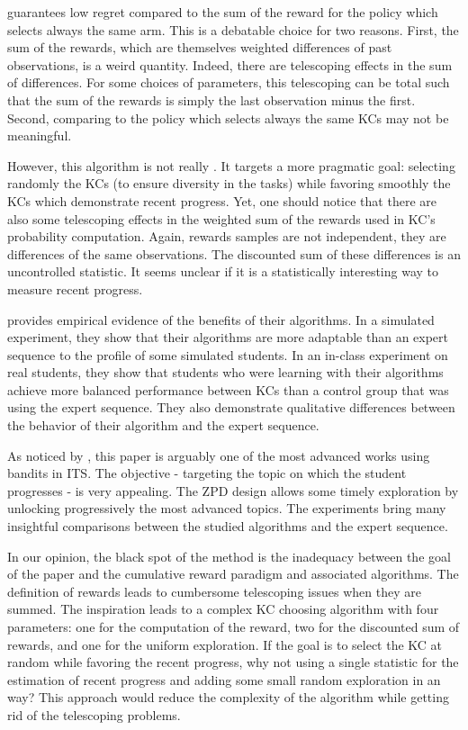 \EXP guarantees low regret compared to the sum of the reward for the policy which selects always the same arm. This is a debatable choice for two reasons. First, the sum of the rewards, which are themselves weighted differences of past observations, is a weird quantity. Indeed, there are telescoping effects in the sum of differences. For some choices of parameters, this telescoping can be total such that the sum of the rewards is simply the last observation minus the first. Second, comparing to the policy which selects always the same KCs may not be meaningful. 

However, this algorithm is not really \EXP. It targets a more pragmatic goal: selecting randomly the KCs (to ensure diversity in the tasks) while favoring smoothly the KCs which demonstrate recent progress. Yet, one should notice that there are also some telescoping effects in the weighted sum of the rewards used in KC's probability computation. Again, rewards samples are not independent, they are differences of the same observations. The discounted sum of these differences is an uncontrolled statistic. It seems unclear if it is a statistically interesting way to measure recent progress.

\citet{clement2015multi} provides empirical evidence of the benefits of their algorithms. In a simulated experiment, they show that their algorithms are more adaptable than an expert sequence to the profile of some simulated students. In an in-class experiment on real students, they show that students who were learning with their algorithms achieve more balanced performance between KCs than a control group that was using the expert sequence. They also demonstrate qualitative differences between the behavior of their algorithm and the expert sequence.

As noticed by \citet{pikeburke2019phd}, this paper is arguably one of the most advanced works using bandits in ITS. The objective - targeting the topic on which the student progresses - is very appealing. The ZPD design allows some timely exploration by unlocking progressively the most advanced topics. The experiments bring many insightful comparisons between the studied algorithms and the expert sequence.

In our opinion, the black spot of the method is the inadequacy between the goal of the paper and the cumulative reward paradigm and associated algorithms. The definition of rewards leads to cumbersome telescoping issues when they are summed. The \EXP inspiration leads to a complex KC choosing algorithm with four parameters: one for the computation of the reward, two for the discounted sum of rewards, and one for the uniform exploration. If the goal is to select the KC at random while favoring the recent progress, why not using a single statistic for the estimation of recent progress and adding some small random exploration in an \epsilongreedy way? This approach would reduce the complexity of the algorithm while getting rid of the telescoping problems.

